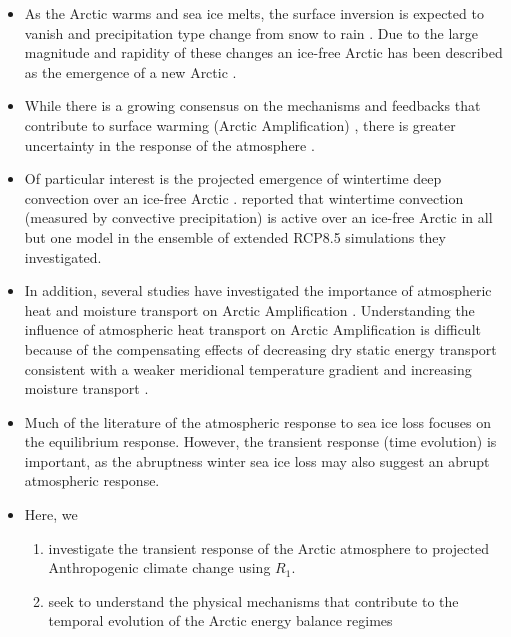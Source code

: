 \documentclass{article}
\begin{document}
\begin{itemize}
    \item As the Arctic warms and sea ice melts, the surface inversion is expected to vanish \citep{bintanja2012} and precipitation type change from snow to rain \citep{bintanja2017}. Due to the large magnitude and rapidity of these changes an ice-free Arctic has been described as the emergence of a new Arctic \citep{serreze2006, landrum2020}.
    \item While there is a growing consensus on the mechanisms and feedbacks that contribute to surface warming (Arctic Amplification) \citep[e.g.,][]{pithan2014, feldl2020}, there is greater uncertainty in the response of the atmosphere \citep{screen2018}.
    \item Of particular interest is the projected emergence of wintertime deep convection over an ice-free Arctic \citep{abbot2008a}. \cite{hankel2021} reported that wintertime convection (measured by convective precipitation) is active over an ice-free Arctic in all but one model in the ensemble of extended RCP8.5 simulations they investigated. 
    \item In addition, several studies have investigated the importance of atmospheric heat and moisture transport on Arctic Amplification \citep{graversen2006,graversen2008,hwang2011,woods2016}. Understanding the influence of atmospheric heat transport on Arctic Amplification is difficult because of the compensating effects of decreasing dry static energy transport consistent with a weaker meridional temperature gradient \citep{chemke2020} and increasing moisture transport \citep{hwang2011, graversen2016}.
    \item Much of the literature of the atmospheric response to sea ice loss focuses on the equilibrium response. However, the transient response (time evolution) is important, as the abruptness winter sea ice loss \citep{hankel2021} may also suggest an abrupt atmospheric response.
    \item Here, we 
    \begin{enumerate}
        \item investigate the transient response of the Arctic atmosphere to projected Anthropogenic climate change using $R_1$.
        \item seek to understand the physical mechanisms that contribute to the temporal evolution of the Arctic energy balance regimes
    \end{enumerate}

\end{itemize}
\end{document}
